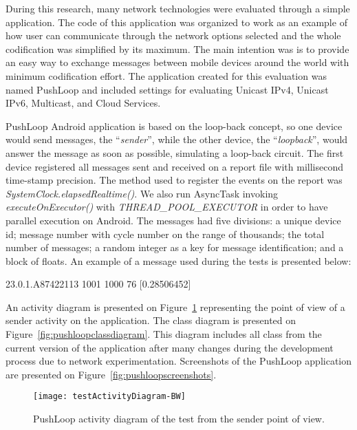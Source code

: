 During this research, many network technologies were evaluated through a simple application.
The code of this application was organized to work as an example of how user can communicate through the network options selected and the whole codification was simplified by its maximum.
The main intention was is to provide an easy way to exchange messages between mobile devices around the world with minimum codification effort.
The application created for this evaluation was named PushLoop and included settings for evaluating Unicast IPv4, Unicast IPv6, Multicast, and Cloud Services.

PushLoop Android application is based on the loop-back concept, so one device would send messages, the ``\textit{sender}'', while the other device, the ``\textit{loopback}'', would answer the message as soon as possible, simulating a loop-back circuit.
The first device registered all messages sent and received on a report file with millisecond time-stamp precision.
The method used to register the events on the report was \textit{SystemClock.elapsedRealtime()}.
We also run AsyncTask invoking \textit{executeOnExecutor()} with \textit{THREAD\_POOL\_EXECUTOR} in order to have parallel execution on Android.
The messages had five divisions: a unique device id; message number with cycle number on the range of thousands; the total number of messages; a random integer as a key for message identification; and a block of floats.
An example of a message used during the tests is presented below:

\begin{footnotesize}
\begin{center}
23.0.1.A87422113 1001 1000 76 [0.28506452]
\end{center}
\end{footnotesize}

An activity diagram is presented on Figure~\ref{fig:pushloopactivityDiagram} representing the point of view of a sender activity on the application.
The class diagram is presented on Figure~\ref{fig:pushloopclassdiagram}.
This diagram includes all class from the current version of the application after many changes during the development process due to network experimentation.
Screenshots of the PushLoop application are presented on Figure~\ref{fig:pushloopscreenshots}.

\begin{figure}[!ht]
\centering
\texttt{[image: testActivityDiagram-BW]}
\caption{PushLoop activity diagram of the test from the sender point of view.}
\label{fig:pushloopactivityDiagram}
\end{figure}

